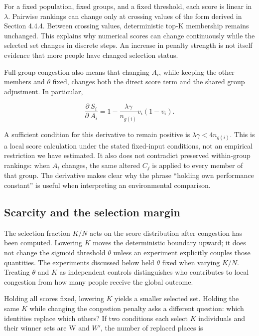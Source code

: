 For a fixed population, fixed groups, and a fixed threshold, each score is linear in \(\lambda\). Pairwise rankings can change only at crossing values of the form derived in Section 4.4.4. Between crossing values, deterministic top-K membership remains unchanged. This explains why numerical scores can change continuously while the selected set changes in discrete steps. An increase in penalty strength is not itself evidence that more people have changed selection status.

Full-group congestion also means that changing \(A_{i}\), while keeping the other members and \(\theta\) fixed, changes both the direct score term and the shared group adjustment. In particular,

\[
\frac{\partial\ S_{i}}{\partial\ A_{i}} = 1 - \frac{\lambda\gamma}{n_{g(i)}}v_{i}(1 - v_{i}).
\]

A sufficient condition for this derivative to remain positive is \(\lambda\gamma<4 n_{g(i)}\). This is a local score calculation under the stated fixed-input conditions, not an empirical restriction we have estimated. It also does not contradict preserved within-group rankings: when \(A_{i}\) changes, the same altered \(C_{j}\) is applied to every member of that group. The derivative makes clear why the phrase ``holding own performance constant'' is useful when interpreting an environmental comparison.

\subsection{Scarcity and the selection margin}\label{scarcity-and-the-selection-margin}

The selection fraction \(K/N\) acts on the score distribution after congestion has been computed. Lowering \(K\) moves the deterministic boundary upward; it does not change the sigmoid threshold \(\theta\) unless an experiment explicitly couples those quantities. The experiments discussed below held \(\theta\) fixed when varying \(K/N\). Treating \(\theta\) and \(K\) as independent controls distinguishes who contributes to local congestion from how many people receive the global outcome.

Holding all scores fixed, lowering \(K\) yields a smaller selected set. Holding the same \(K\) while changing the congestion penalty asks a different question: which identities replace which others? If two conditions each select \(K\) individuals and their winner sets are W and \(W'\), the number of replaced places is

